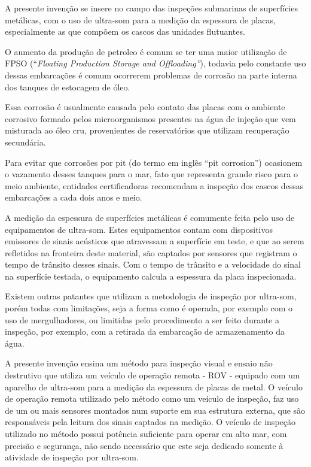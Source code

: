 \documentclass[a4paper,12pt]{article}
\begin{document}
 \vspace{1,0cm}
 
 A presente invenção se insere no campo das inspeções submarinas
de superfícies metálicas, com o uso de ultra-som para a medição da
espessura de placas, especialmente as que compõem os cascos das
unidades flutuantes.

O aumento da produção de petroleo é comum se ter uma maior utilização de FPSO (“\textit{Floating Production Storage and Offloading”}), todavia pelo constante uso dessas embarcações é comum ocorrerem problemas de corrosão na parte interna dos tanques de estocagem de óleo.

Essa corrosão é usualmente causada pelo contato das placas com o
ambiente corrosivo formado pelos microorganismos presentes na água de
injeção que vem misturada ao óleo cru, provenientes de reservatórios que
utilizam recuperação secundária.

Para evitar que corrosões por pit (do termo em inglês “pit
corrosion”) ocasionem o vazamento desses tanques para o mar, fato que
representa grande risco para o meio ambiente, entidades certificadoras
recomendam a inspeção dos cascos dessas embarcações a cada dois anos
e meio.

A medição da espessura de superfícies metálicas é comumente feita
pelo uso de equipamentos de ultra-som. Estes equipamentos contam com
dispositivos emissores de sinais acústicos que atravessam a superfície em
teste, e que ao serem refletidos na fronteira deste material, são captados
por sensores que registram o tempo de trânsito desses sinais. Com o tempo
de trânsito e a velocidade do sinal na superfície testada, o equipamento
calcula a espessura da placa inspecionada.

Existem outras patantes que utilizam a metodologia de inspeção por ultra-som, porém todas com limitações, seja a forma como é operada, por exemplo com o uso de mergulhadores, ou limitidas pelo procedimento a ser feito durante a inspeção, por exemplo, com a retirada da embarcação de armazenamento da água.


A presente invenção ensina um método para inspeção visual e ensaio não
destrutivo que utiliza um veículo de operação remota - ROV - equipado
com um aparelho de ultra-som para a medição da espessura de placas de
metal.
O veículo de operação remota utilizado pelo método como um veículo
de inspeção, faz uso de um ou mais sensores montados num suporte em
sua estrutura externa, que são responsáveis pela leitura dos sinais captados
na medição. O veículo de inspeção utilizado no método possui potência suficiente
para operar em alto mar, com precisão e segurança, não sendo necessário
que este seja dedicado somente à atividade de inspeção por ultra-som.
\end{document}
